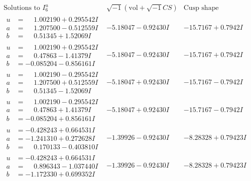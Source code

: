 \documentclass[1p]{elsarticle_modified}
\theoremstyle{definition}
\newcommand{\I}{\sqrt{-1}}
\begin{document}
$$\begin{array}{c|c|c}  
\text{Solutions to }I^u_{6}& \I (\text{vol} + \sqrt{-1}CS) & \text{Cusp shape}\\
 \hline 
\begin{aligned}
u &= \phantom{-}1.002190 + 0.295542 I \\
a &= \phantom{-}1.207500 - 0.512559 I \\
b &= \phantom{-}0.51345 + 1.52069 I\end{aligned}
 & -5.18047 - 0.92430 I & -15.7167 + 0.7942 I \\ \hline\begin{aligned}
u &= \phantom{-}1.002190 + 0.295542 I \\
a &= \phantom{-}0.47863 - 1.41379 I \\
b &= -0.085204 - 0.856161 I\end{aligned}
 & -5.18047 - 0.92430 I & -15.7167 + 0.7942 I \\ \hline\begin{aligned}
u &= \phantom{-}1.002190 - 0.295542 I \\
a &= \phantom{-}1.207500 + 0.512559 I \\
b &= \phantom{-}0.51345 - 1.52069 I\end{aligned}
 & -5.18047 + 0.92430 I & -15.7167 - 0.7942 I \\ \hline\begin{aligned}
u &= \phantom{-}1.002190 - 0.295542 I \\
a &= \phantom{-}0.47863 + 1.41379 I \\
b &= -0.085204 + 0.856161 I\end{aligned}
 & -5.18047 + 0.92430 I & -15.7167 - 0.7942 I \\ \hline\begin{aligned}
u &= -0.428243 + 0.664531 I \\
a &= -1.241310 + 0.272628 I \\
b &= \phantom{-}0.170133 - 0.403810 I\end{aligned}
 & -1.39926 - 0.92430 I & -8.28328 + 0.79423 I \\ \hline\begin{aligned}
u &= -0.428243 + 0.664531 I \\
a &= \phantom{-}0.896343 - 1.037440 I \\
b &= -1.172330 + 0.699352 I\end{aligned}
 & -1.39926 - 0.92430 I & -8.28328 + 0.79423 I \\ \hline\begin{aligned}

\end{aligned}
\end{array}$$
\end{document}
